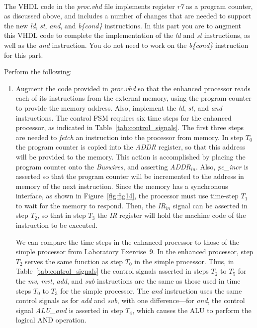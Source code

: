 \documentclass[epsfig,10pt,fullpage]{article} \addtolength{\textwidth}{1.5in}
\begin{document}
~\\
\noindent
The VHDL code in the {\it proc.vhd} file implements register {\it r7} as a program counter,
as discussed above, and includes a number of changes that are needed to support the 
new {\it ld}, {\it st}, {\it and}, and {\it b\{cond\}} instructions. In this part you are to 
augment this VHDL code to complete the implementation of the {\it ld} and
{\it st} instructions, as well as the {\it and} instruction. You do not 
need to work on the {\it b\{cond\}} instruction for this part. 

\noindent
Perform the following:
\begin{enumerate}
\item Augment the code provided in {\it proc.vhd} so that the enhanced processor reads each
of its instructions from the external memory, using the program counter to provide the
memory address. Also, implement the {\it ld}, {\it st}, and {\it and} instructions. The
control FSM requires six time steps for the enhanced processor, as indicated in 
Table~\ref{tab:control_signals}.  The first three steps are needed to {\it fetch} 
an instruction into the processor from memory. In step $T_0$ 
the program counter is copied into the {\it ADDR} register, so that this
address will be provided to the memory. This action is accomplished by placing the program
counter onto the {\it Buswires}, and asserting {\it ADDR}$_{in}$. Also, 
{\it pc\_incr} is asserted so that the program counter will be incremented
to the address in memory of the next instruction. Since the memory has a synchronous
interface, as shown in Figure~\ref{fig:fig14}, the processor must use time-step $T_1$ to 
wait for the memory to respond. Then, the {\it IR$_{in}$} signal can be asserted in step
$T_2$, so that in step $T_3$ the {\it IR} register will hold the machine code of the
instruction to be executed. 

We can compare the time steps in the enhanced processor to those of the simple processor from
Laboratory Exercise~9. In the enhanced processor, step $T_2$ serves the same function as 
step $T_0$ in the simple processor. Thus, in Table~\ref{tab:control_signals} the control signals
asserted in steps $T_2$ to $T_5$ for the {\it mv}, {\it mvt}, {\it add}, and {\it sub} 
instructions are the same as those used in time steps $T_0$ to $T_3$ for the simple processor. 
The {\it and} instruction uses the same control signals as for {\it add} and {\it sub},
with one difference---for {\it and}, the control signal {\it ALU\_and} is asserted in 
step $T_4$, which causes the ALU to perform the logical AND operation.


\end{enumerate}
\end{document}

